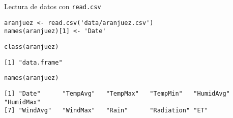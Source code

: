 \documentclass[xcolor={usenames,svgnames,dvipsnames}]{beamer}
\begin{document}
\begin{frame}[fragile,label=sec-1-3]{Lectura de datos con \texttt{read.csv}}
 \lstset{language=R,label= ,caption= ,numbers=none}
\begin{lstlisting}
aranjuez <- read.csv('data/aranjuez.csv')
names(aranjuez)[1] <- 'Date'
\end{lstlisting}

\lstset{language=R,label= ,caption= ,numbers=none}
\begin{lstlisting}
class(aranjuez)
\end{lstlisting}

\begin{verbatim}
[1] "data.frame"
\end{verbatim}

\lstset{language=R,label= ,caption= ,numbers=none}
\begin{lstlisting}
names(aranjuez)
\end{lstlisting}

\begin{verbatim}
[1] "Date"      "TempAvg"   "TempMax"   "TempMin"   "HumidAvg"  "HumidMax" 
[7] "WindAvg"   "WindMax"   "Rain"      "Radiation" "ET"
\end{verbatim}
\end{frame}
\end{document}
